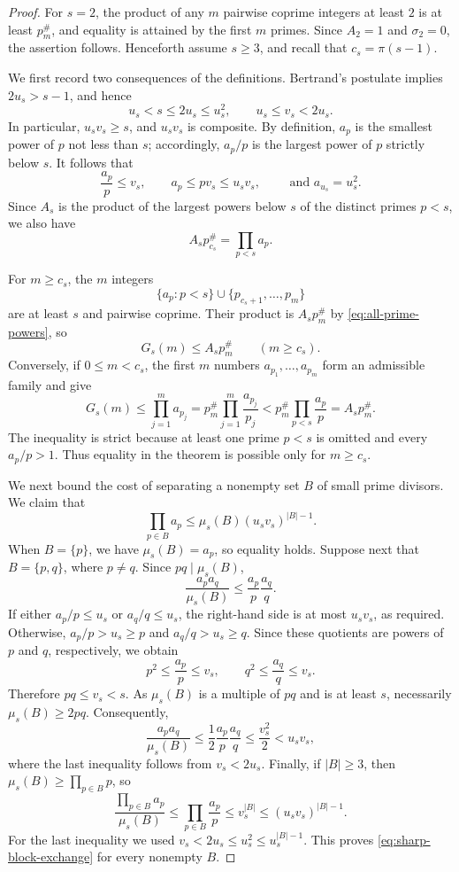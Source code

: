 \documentclass[11pt,onecolumn]{IEEEtran}
\newcommand{\primorial}[1]{p_{#1}^{\#}}
\begin{document}
\begin{proof}
For $s=2$, the product of any $m$ pairwise coprime integers
at least $2$ is at least $\primorial{m}$, and equality is
attained by the first $m$ primes.  Since $A_2=1$ and
$\sigma_2=0$, the assertion follows.  Henceforth assume $s\ge3$,
and recall that $c_s=\pi(s-1)$.

We first record two consequences of the definitions.  Bertrand's
postulate \cite{HardyWright2008} implies $2u_s>s-1$, and hence
\[
u_s<s\le2u_s\le u_s^2,
  \qquad u_s\le v_s<2u_s.
\]
In particular, $u_sv_s\ge s$, and $u_sv_s$ is composite.
By definition, $a_p$ is the smallest power of $p$ not less than $s$;
accordingly, $a_p/p$ is the largest power of $p$ strictly
below $s$.  It follows that
\[
 \frac{a_p}{p}\le v_s,\qquad
 a_p\le pv_s\le u_sv_s,\qquad\text{ and } a_{u_s}=u_s^2.
\]
Since $A_s$ is the product of the largest powers below $s$
of the distinct primes $p<s$, we also have
\begin{equation}
 A_s\primorial{c_s}=\prod_{p<s}a_p.
 \label{eq:all-prime-powers}
\end{equation}

For $m\ge c_s$, the $m$ integers
\[
 \{a_p:p<s\}\cup\{p_{c_s+1},\ldots,p_m\}
\]
are at least $s$ and pairwise coprime.  Their product is
$A_s\primorial{m}$ by \eqref{eq:all-prime-powers}, so
\[
G_s(m)\le A_s\primorial{m}\qquad(m\ge c_s).
\]
Conversely, if $0\le m<c_s$, the first $m$ numbers
$a_{p_1},\ldots,a_{p_m}$ form an admissible family and give
\[
 G_s(m)\le\prod_{j=1}^m a_{p_j}
   =\primorial{m}\prod_{j=1}^m\frac{a_{p_j}}{p_j}<\primorial{m}\prod_{p<s}\frac{a_p}{p}
   =A_s\primorial{m}.
\]
The inequality is strict because at least one prime $p<s$
is omitted and every $a_p/p>1$.  Thus equality in the
theorem is possible only for $m\ge c_s$.

We next bound the cost of separating a nonempty set $B$ of
small prime divisors. We claim that
\begin{equation}
 \prod_{p\in B}a_p
 \le\mu_s(B)(u_sv_s)^{|B|-1}.
 \label{eq:sharp-block-exchange}
\end{equation}
When $B=\{p\}$, we have $\mu_s(B)=a_p$, so equality holds.
Suppose next that $B=\{p,q\}$, where $p\ne q$.  Since
$pq\mid\mu_s(B)$,
\[
\frac{a_pa_q}{\mu_s(B)}
 \le\frac{a_p}{p}\frac{a_q}{q}.
\]
If either $a_p/p\le u_s$ or $a_q/q\le u_s$, the right-hand
side is at most $u_sv_s$, as required.  Otherwise,
$a_p/p>u_s\ge p$ and $a_q/q>u_s\ge q$.  Since these
quotients are powers of $p$ and $q$, respectively, we obtain
\[
 p^2\le\frac{a_p}{p}\le v_s,
 \qquad q^2\le\frac{a_q}{q}\le v_s.
\]
Therefore $pq\le v_s<s$.  As $\mu_s(B)$ is a multiple
of $pq$ and is at least $s$, necessarily
$\mu_s(B)\ge2pq$.  Consequently,
\[
 \frac{a_pa_q}{\mu_s(B)}
 \le\frac12\frac{a_p}{p}\frac{a_q}{q}
 \le\frac{v_s^2}{2}<u_sv_s,
\]
where the last inequality follows from $v_s<2u_s$.
Finally, if $|B|\ge3$, then $\mu_s(B)\ge\prod_{p\in B}p$,
so
\[
 \frac{\prod_{p\in B}a_p}{\mu_s(B)}
 \le\prod_{p\in B}\frac{a_p}{p}
 \le v_s^{|B|}
 \le(u_sv_s)^{|B|-1}.
\]
For the last inequality we used
$v_s<2u_s\le u_s^2\le u_s^{|B|-1}$.
This proves \eqref{eq:sharp-block-exchange} for every nonempty $B$.


\end{proof}
\end{document}
